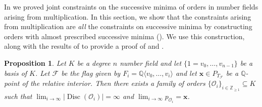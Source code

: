 \documentclass[letterpaper,10pt]{amsart}
\DeclareMathOperator{\Disc}{Disc}
\newcommand{\ZZ}{\mathbb{Z}}      %
\newcommand{\QQ}{\mathbb{Q}}      %
\newcommand{\cO}{\mathcal{O}}      %
\newcommand{\la}{\langle}
\newcommand{\ra}{\rangle}
\newcommand{\cF}{\mathcal{F}}
\newtheorem{proposition}[theorem]{Proposition}
\theoremstyle{definition}
\theoremstyle{remark}
\begin{document}
In  we proved joint constraints on the successive minima of orders in number fields arising from multiplication. In this section, we show that the constraints arising from multiplication are \emph{all} the constraints on successive minima by constructing orders with almost prescribed successive minima (). We use this construction, along with the results of  to provide a proof of  and . 

\begin{proposition}
\label{prop:direction-1-mult-spectrum}
Let $K$ be a degree $n$ number field and let $\{1=v_0,\dots,v_{n-1}\}$ be a basis of $K$. Let $\cF$ be the flag given by $F_i = \QQ \la v_0,\dots,v_i\ra$ and let $\mathbf{x} \in P_{T_{\cF}}$ be a $\QQ$-point of the relative interior. Then there exists a family of orders $\{\cO_i\}_{i \in \ZZ_{\geq 1}} \subseteq K$ such that $\lim_{i \rightarrow \infty }\lvert \Disc(\cO_i)\rvert = \infty$ and $\lim_{i \rightarrow \infty} p_{\cO_i} = \mathbf{x}$.
\end{proposition}
\end{document}
